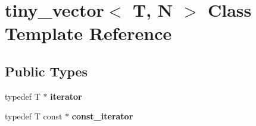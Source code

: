 \hypertarget{classtiny__vector}{}\section{tiny\+\_\+vector$<$ T, N $>$ Class Template Reference}
\label{classtiny__vector}
\subsection*{Public Types}
\begin{DoxyCompactItemize}
\item 
\mbox{\label{classtiny__vector_a22b0266186947ba3921410f4fefe0fb5}} 
typedef T $\ast$ {\bfseries iterator}
\item 
\mbox{\label{classtiny__vector_aa46897317dfe1e2e0390b759a7a42d4a}} 
typedef T const  $\ast$ {\bfseries const\+\_\+iterator}
\end{DoxyCompactItemize}
